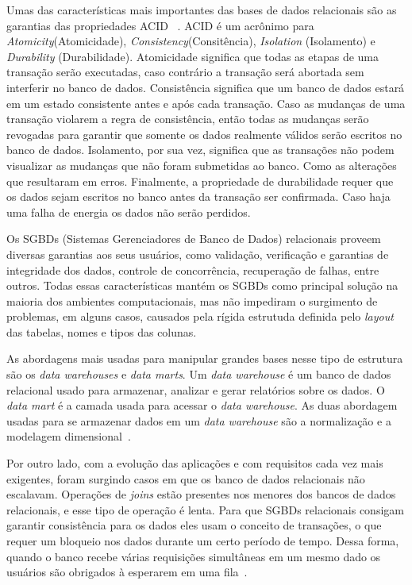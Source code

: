 Umas das características mais importantes das bases de dados relacionais são as garantias das propriedades ACID  ~\cite{Orendanalysisand}. ACID é um acrônimo para \textit{Atomicity}(Atomicidade), \textit{Consistency}(Consitência), \textit{Isolation} (Isolamento) e \textit{Durability} (Durabilidade).
Atomicidade significa que todas as etapas de uma transação serão executadas, caso contrário a transação será abortada sem interferir no banco de dados. Consistência significa que um banco de dados estará em um estado consistente antes e após cada transação. Caso as mudanças de uma transação violarem a regra de consistência, então todas as mudanças serão revogadas para garantir que somente os dados realmente válidos serão escritos no banco de dados. Isolamento, por sua vez, significa que as transações não podem visualizar as mudanças que não foram submetidas ao banco. Como as alterações que resultaram em erros. Finalmente, a propriedade de durabilidade requer que os dados sejam escritos no banco antes da transação ser confirmada. Caso haja uma falha de energia os dados não serão perdidos.

Os SGBDs (Sistemas Gerenciadores de Banco de Dados) relacionais proveem diversas garantias aos seus usuários, como validação, verificação e garantias de integridade dos dados, controle de concorrência, recuperação de falhas,  entre outros. Todas essas características mantém os SGBDs como principal solução na maioria dos ambientes computacionais, mas não impediram o surgimento de problemas, em alguns casos, causados pela rígida estrutuda definida pelo \textit{layout} das tabelas, nomes e tipos das colunas.

As abordagens mais usadas para manipular grandes bases nesse tipo de estrutura são os \textit{data warehouses} e \textit{data marts}. Um \textit{data warehouse} é um banco de dados relacional usado para armazenar, analizar e gerar relatórios sobre os dados. O \textit{data mart} é a camada usada para acessar o \textit{data warehouse}. As duas abordagem usadas para se armazenar dados em um \textit{data warehouse} são a normalização e a modelagem dimensional~\cite{bigdataarchitectureandapproach}.

Por outro lado, com a evolução das aplicações e com requisitos cada vez mais exigentes, foram surgindo casos em que os banco de dados relacionais não escalavam. Operações de \textit{joins} estão presentes nos menores dos bancos de dados relacionais, e esse tipo de operação é lenta. Para que SGBDs relacionais consigam garantir consistência para os dados eles usam o conceito de transações, o que requer um bloqueio nos dados durante um certo período de tempo.  Dessa forma, quando o banco recebe várias requisições simultâneas em um mesmo dado os usuários são obrigados à esperarem em uma fila~\cite{cassandraguide}.

